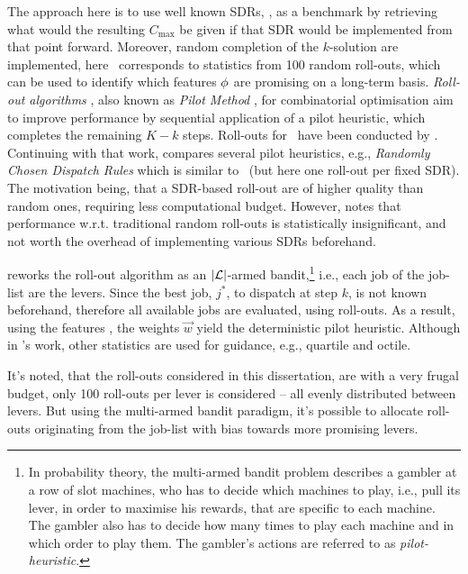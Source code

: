 The approach here is to use well known SDRs, \phiSDRRelated, as a benchmark by 
retrieving what would the resulting $C_{\max}$ be given if that SDR would 
be implemented from that point forward. 
Moreover, random completion of the $k$-solution are implemented, 
here \phiRNDRelated\ corresponds to statistics from 100 random roll-outs, which 
can be used to identify which features ${\mathbf{\phi}}$ are promising on a long-term 
basis. 
\emph{Roll-out algorithms} \citep{Bertsekas97}, also known as \emph{Pilot 
    Method} \citep{Duin99}, for combinatorial optimisation aim to improve 
performance by sequential application of a pilot heuristic, which completes the 
remaining $K-k$ steps. Roll-outs for \JSP\ have been conducted by 
\citet{Ru12}. Continuing with that work, \citet{Geirsson2012} compares several 
pilot heuristics, e.g., \emph{Randomly Chosen Dispatch Rules} which is similar 
to \phiSDRRelated\ (but here one roll-out per fixed SDR). 
The motivation being, that a SDR-based roll-out are of higher quality than 
random ones, requiring less computational budget. 
However, \citeauthor{Geirsson2012} notes that performance w.r.t. traditional 
random roll-outs is statistically insignificant, and not worth the overhead of 
implementing various SDRs beforehand. 

\citeauthor{Geirsson2012} reworks the roll-out algorithm as an 
$\lvert\mathcal{L}\rvert$-armed bandit,\footnote{In probability theory, the
    multi-armed bandit problem \citep{badit:book} describes a gambler at a row 
    of slot machines, who has to decide which machines to play, i.e., pull its 
    lever, in  order to maximise his rewards, that are specific to each 
    machine. The gambler also has to decide how many times to play each machine 
    and in which order to play them. The gambler's actions are referred to as 
    \emph{pilot-heuristic}.} 
i.e., each job of the job-list are the levers. Since the best job, $j^*$, to 
dispatch at step $k$, is not known beforehand, therefore all available jobs are 
evaluated, using roll-outs. 
As a result, using the features \phiRNDRelated, the weights $\vec{w}$ yield the 
deterministic pilot heuristic. Although in \citeauthor{Geirsson2012}'s work, 
other statistics are used for guidance, e.g., quartile and octile. 

It's noted, that the roll-outs considered in this dissertation, are with a very 
frugal budget, only 100 roll-outs per lever is considered -- all evenly 
distributed between levers. But using the multi-armed bandit paradigm, it's 
possible to allocate roll-outs originating from the job-list with bias towards 
more promising levers.

